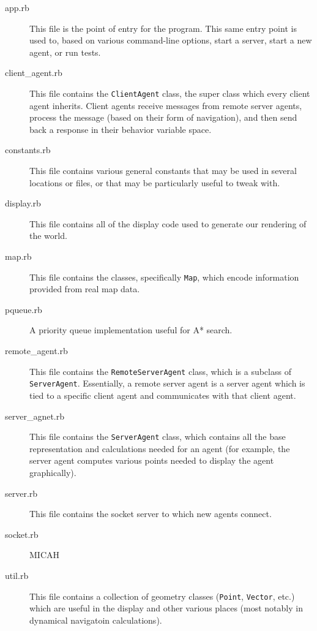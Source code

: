 \documentclass{article}
\newcommand{\code}{\texttt}
\begin{document}
\begin{description}
\item[app.rb] This file is the point of entry for the program. This same entry
  point is used to, based on various command-line options, start a server, start
  a new agent, or run tests.

\item[client\_agent.rb] This file contains the \code{ClientAgent} class, the
  super class which every client agent inherits. Client agents receive messages
  from remote server agents, process the message (based on their form of
  navigation), and then send back a response in their behavior variable space.

\item[constants.rb] This file contains various general constants that may be
  used in several locations or files, or that may be particularly useful to
  tweak with.

\item[display.rb] This file contains all of the display code used to generate
  our rendering of the world.

\item[map.rb] This file contains the classes, specifically \code{Map}, which
  encode information provided from real map data.

\item[pqueue.rb] A priority queue implementation useful for A* search.

\item[remote\_agent.rb] This file contains the \code{RemoteServerAgent} class,
  which is a subclass of \code{ServerAgent}. Essentially, a remote server agent
  is a server agent which is tied to a specific client agent and communicates
  with that client agent.

\item[server\_agnet.rb] This file contains the \code{ServerAgent} class, which
  contains all the base representation and calculations needed for an agent (for
  example, the server agent computes various points needed to display the agent
  graphically).

\item[server.rb] This file contains the socket server to which new agents
  connect.

\item[socket.rb] MICAH

\item[util.rb] This file contains a collection of geometry classes
  (\code{Point}, \code{Vector}, etc.) which are useful in the display and other
  various places (most notably in dynamical navigatoin calculations).


\end{description}
\end{document}
